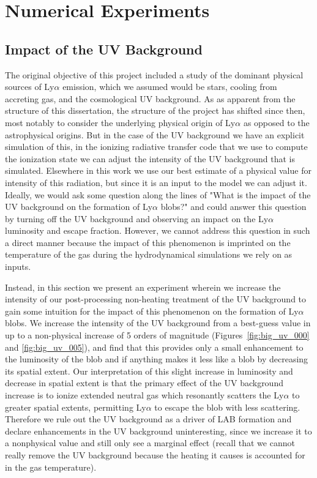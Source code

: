 \chapter{Numerical Experiments}
\label{sec:experiments}

\section{Impact of the UV Background}
The original objective of this project included a study of the dominant physical sources of Ly$\alpha$ emission, which we assumed would be stars, cooling from accreting gas, and the cosmological UV background.
As as apparent from the structure of this dissertation, the structure of the project has shifted since then, most notably to consider the underlying physical origin of Ly$\alpha$ as opposed to the astrophysical origins.
But in the case of the UV background we have an explicit simulation of this, in the ionizing radiative transfer code that we use to compute the ionization state we can adjust the intensity of the UV background that is simulated.
Elsewhere in this work we use our best estimate of a physical value for intensity of this radiation, but since it is an input to the model we can adjust it.
Ideally, we would ask some question along the lines of "What is the impact of the UV background on the formation of Ly$\alpha$ blobs?" and could answer this question by turning off the UV background and observing an impact on the Ly$\alpha$ luminosity and escape fraction.
However, we cannot address this question in such a direct manner because the impact of this phenomenon is imprinted on the temperature of the gas during the hydrodynamical simulations we rely on as inputs.

Instead, in this section we present an experiment wherein we increase the intensity of our post-processing non-heating treatment of the UV background to gain some intuition for the impact of this phenomenon on the formation of Ly$\alpha$ blobs.
We increase the intensity of the UV background from a best-guess value in \citet{Faucher-Giguere2009} up to a non-physical increase of 5 orders of magnitude (Figures~\ref{fig:big_uv_000} and \ref{fig:big_uv_005}), and find that this provides only a small enhancement to the luminosity of the blob and if anything makes it less like a blob by decreasing its spatial extent.
Our interpretation of this slight increase in luminosity and decrease in spatial extent is that the primary effect of the UV background increase is to ionize extended neutral gas which resonantly scatters the Ly$\alpha$ to greater spatial extents, permitting Ly$\alpha$ to escape the blob with less scattering.
Therefore we rule out the UV background as a driver of LAB formation and declare enhancements in the UV background uninteresting, since we increase it to a nonphysical value and still only see a marginal effect (recall that we cannot really remove the UV background because the heating it causes is accounted for in the gas temperature).


